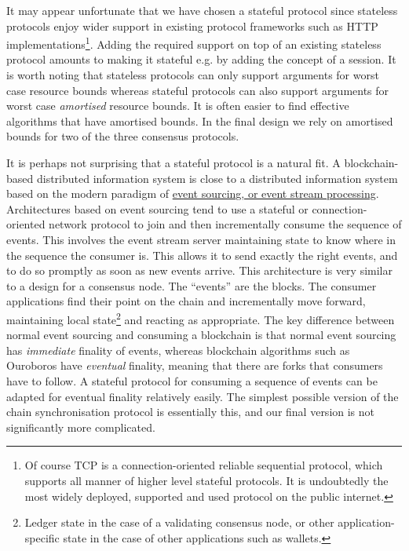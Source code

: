 \documentclass[]{article}
\begin{document}
It may appear unfortunate that we have chosen a stateful protocol since
stateless protocols enjoy wider support in existing protocol frameworks
such as HTTP implementations\footnote{Of course TCP is a
  connection-oriented reliable sequential protocol, which supports all
  manner of higher level stateful protocols. It is undoubtedly the most
  widely deployed, supported and used protocol on the public internet.}.
Adding the required support on top of an existing stateless protocol
amounts to making it stateful e.g. by adding the concept of a session.
It is worth noting that stateless protocols can only support arguments
for worst case resource bounds whereas stateful protocols can also
support arguments for worst case \emph{amortised} resource bounds. It is
often easier to find effective algorithms that have amortised bounds. In
the final design we rely on amortised bounds for two of the three
consensus protocols.

It is perhaps not surprising that a stateful protocol is a natural fit.
A blockchain-based distributed information system is close to a
distributed information system based on the modern paradigm of
\href{https://en.wikipedia.org/wiki/Event-driven_architecture}{{event
sourcing, or event stream processing}}. Architectures based on event
sourcing tend to use a stateful or connection-oriented network protocol
to join and then incrementally consume the sequence of events. This
involves the event stream server maintaining state to know where in the
sequence the consumer is. This allows it to send exactly the right
events, and to do so promptly as soon as new events arrive. This
architecture is very similar to a design for a consensus node. The
``events'' are the blocks. The consumer applications find their point on
the chain and incrementally move forward, maintaining local
state\footnote{Ledger state in the case of a validating consensus node,
  or other application-specific state in the case of other applications
  such as wallets.} and reacting as appropriate. The key difference
between normal event sourcing and consuming a blockchain is that normal
event sourcing has \emph{immediate} finality of events, whereas
blockchain algorithms such as Ouroboros have \emph{eventual} finality,
meaning that there are forks that consumers have to follow. A stateful
protocol for consuming a sequence of events can be adapted for eventual
finality relatively easily. The simplest possible version of the chain
synchronisation protocol is essentially this, and our final version is
not significantly more complicated.
\end{document}
